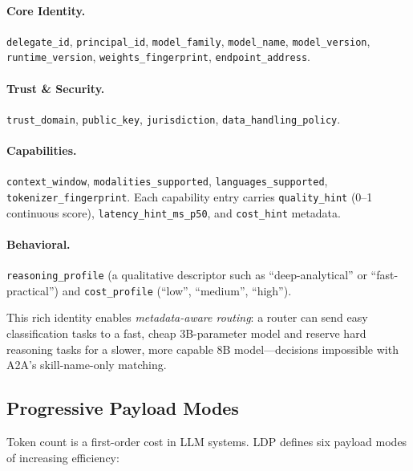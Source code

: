 \documentclass[11pt,a4paper]{article}
\newcommand{\ldp}{\textsc{LDP}}
\newcommand{\atoa}{\textsc{A2A}}
\begin{document}
\paragraph{Core Identity.} \texttt{delegate\_id}, \texttt{principal\_id}, \texttt{model\_family}, \texttt{model\_name}, \texttt{model\_version}, \texttt{runtime\_version}, \texttt{weights\_fingerprint}, \texttt{endpoint\_address}.

\paragraph{Trust \& Security.} \texttt{trust\_domain}, \texttt{public\_key}, \texttt{jurisdiction}, \texttt{data\_handling\_policy}.

\paragraph{Capabilities.} \texttt{context\_window}, \texttt{modalities\_supported}, \texttt{languages\_supported}, \texttt{tokenizer\_fingerprint}. Each capability entry carries \texttt{quality\_hint} (0--1 continuous score), \texttt{latency\_hint\_ms\_p50}, and \texttt{cost\_hint} metadata.

\paragraph{Behavioral.} \texttt{reasoning\_profile} (a qualitative descriptor such as ``deep-analytical'' or ``fast-practical'') and \texttt{cost\_profile} (``low'', ``medium'', ``high'').

This rich identity enables \emph{metadata-aware routing}: a router can send easy classification tasks to a fast, cheap 3B-parameter model and reserve hard reasoning tasks for a slower, more capable 8B model---decisions impossible with \atoa{}'s skill-name-only matching.

\subsection{Progressive Payload Modes}
\label{sec:payload}

Token count is a first-order cost in LLM systems. \ldp{} defines six payload modes of increasing efficiency:
\end{document}
